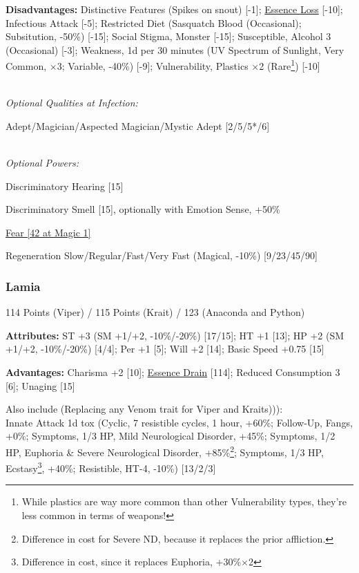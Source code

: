 \begin{multicols*}{3}
	\textbf{Disadvantages:}	
	Distinctive Features (Spikes on snout) [-1]; \hyperref[essence_loss]{Essence Loss} [-10]; Infectious Attack [-5]; Restricted Diet (Sasquatch Blood (Occasional); Subsitution, -50\%) [-15]; Social Stigma, Monster [-15]; Susceptible, Alcohol 3 (Occasional) [-3]; Weakness, 1d per 30 minutes (UV Spectrum of Sunlight, Very Common, $\times$3; Variable, -40\%) [-9]; Vulnerability, Plastics $\times$2 (Rare\footnote{While plastics are way more common than other Vulnerability types, they're less common in terms of weapons!}) [-10]
	
	\textit{\\Optional Qualities at Infection:}
	
	Adept/Magician/Aspected Magician/Mystic Adept [2/5/5*/6]
	
	\textit{\\Optional Powers:}
	
	
	Discriminatory Hearing [15]
	
	Discriminatory Smell [15], optionally with Emotion Sense, +50\%
	
	\hyperref[fear]{Fear [42 at Magic 1]}
	
	Regeneration Slow/Regular/Fast/Very Fast (Magical, -10\%) [9/23/45/90]
		
	\subsubsection{Lamia}\label{lamia}
	\begin{flushright}
		114 Points (Viper) / 115 Points (Krait) / 123 (Anaconda and Python)
	\end{flushright}

	\textbf{Attributes:}
	ST +3 (SM +1/+2, -10\%/-20\%) [17/15]; HT +1 [13]; HP +2 (SM +1/+2, -10\%/-20\%) [4/4]; Per +1 [5]; Will +2 [14]; Basic Speed +0.75 [15]
	
	\textbf{Advantages:}
	Charisma +2 [10]; \hyperref[essence_drain]{Essence Drain} [114]; Reduced Consumption 3 [6]; Unaging [15]
	
	Also include (Replacing any Venom trait for Viper and Kraits))):\\
	Innate Attack 1d tox (Cyclic, 7 resistible cycles, 1 hour, +60\%; Follow-Up, Fangs, +0\%; Symptoms, 1/3 HP, Mild Neurological Disorder, +45\%; Symptoms, 1/2 HP, Euphoria \& Severe Neurological Disorder, +85\%\footnote{Difference in cost for Severe ND, because it replaces the prior affliction.}; Symptoms, 1/3 HP, Ecstasy\footnote{Difference in cost, since it replaces Euphoria, +30\%$\times$2}, +40\%; Resistible, HT-4, -10\%) [13/2/3]
	

\end{multicols*}
